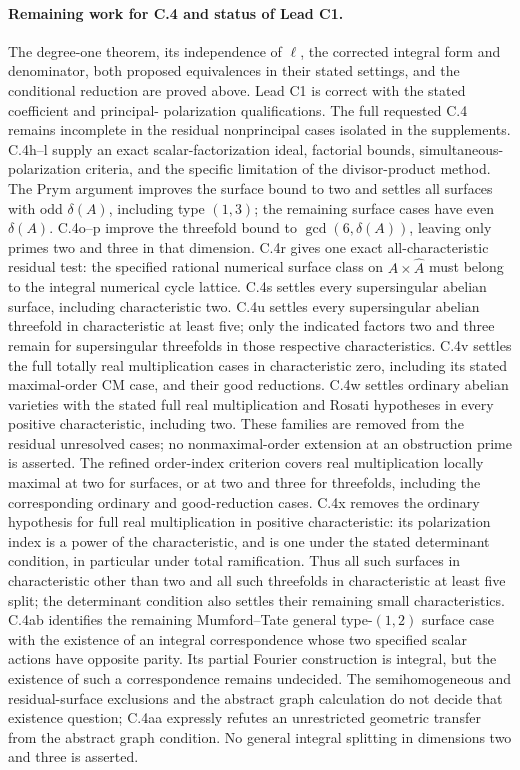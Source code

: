 \paragraph{Remaining work for C.4 and status of Lead C1.}
The degree-one theorem, its independence of $\ell$, the corrected
integral form and denominator, both proposed equivalences in their
stated settings, and the conditional reduction are proved above.
Lead C1 is correct with the stated coefficient and principal-
polarization qualifications. The full requested C.4 remains
incomplete in the residual nonprincipal cases isolated in the
supplements. C.4h--l supply an exact scalar-factorization ideal,
factorial bounds, simultaneous-polarization criteria, and the specific
limitation of the divisor-product method. The Prym argument improves
the surface bound to two and settles all surfaces with odd
$\delta(A)$, including type $(1,3)$; the remaining surface cases have
even $\delta(A)$. C.4o--p improve the threefold bound to
$\gcd(6,\delta(A))$, leaving only primes two and three in that
dimension. C.4r gives one exact all-characteristic residual test:
the specified rational numerical surface class on $A\times\widehat A$
must belong to the integral numerical cycle lattice. C.4s settles
every supersingular abelian surface, including characteristic two.
C.4u settles every supersingular abelian threefold in
characteristic at least five; only the indicated factors two
and three remain for supersingular threefolds in those respective
characteristics.
C.4v settles the full totally real multiplication cases in
characteristic zero, including its stated maximal-order CM
case, and their good reductions. C.4w settles ordinary
abelian varieties with the stated full real multiplication
and Rosati hypotheses in every positive characteristic,
including two. These families are removed from the
residual unresolved cases; no nonmaximal-order extension
at an obstruction prime is asserted. The refined order-index
criterion covers real multiplication locally maximal at two
for surfaces, or at two and three for threefolds, including
the corresponding ordinary and good-reduction cases.
C.4x removes the ordinary hypothesis for full real multiplication
in positive characteristic: its polarization index is a power
of the characteristic, and is one under the stated determinant
condition, in particular under total ramification. Thus all such
surfaces in characteristic other than two and all such threefolds
in characteristic at least five split; the determinant condition
also settles their remaining small characteristics.
C.4ab identifies the remaining Mumford--Tate general
type-$(1,2)$ surface case with the existence of an integral
correspondence whose two specified scalar actions have
opposite parity. Its partial Fourier construction is integral,
but the existence of such a correspondence remains undecided.
The semihomogeneous and residual-surface exclusions and the
abstract graph calculation do not decide that existence question;
C.4aa expressly refutes an unrestricted geometric transfer
from the abstract graph condition.
No general integral splitting in dimensions two and three is
asserted.

